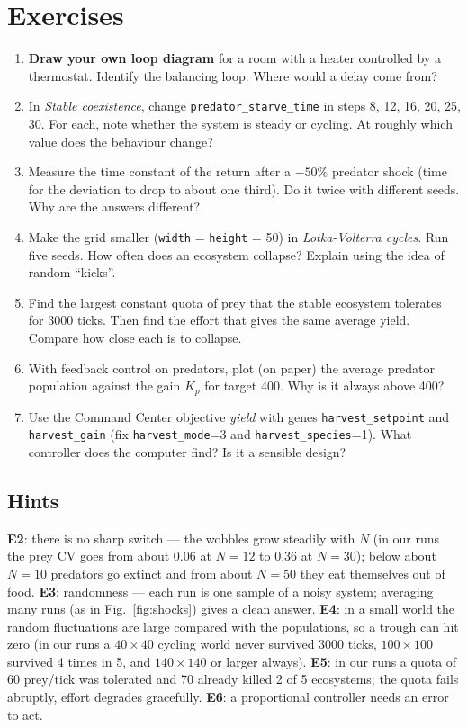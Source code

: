 \documentclass[11pt,a4paper]{article}
\newcommand{\param}[1]{\texttt{\small #1}}
\begin{document}
\section*{Exercises}
\begin{enumerate}[label=\textbf{E\arabic*.}]
  \item \textbf{Draw your own loop diagram} for a room with a heater controlled by a thermostat. Identify the
        balancing loop. Where would a delay come from?
  \item In \emph{Stable coexistence}, change \param{predator\_starve\_time} in steps 8, 12, 16, 20, 25, 30.
        For each, note whether the system is steady or cycling. At roughly which value does the behaviour change?
  \item Measure the time constant of the return after a $-50\%$ predator shock (time for the deviation to
        drop to about one third). Do it twice with different seeds. Why are the answers different?
  \item Make the grid smaller (\param{width} = \param{height} = 50) in \emph{Lotka-Volterra cycles}. Run five seeds.
        How often does an ecosystem collapse? Explain using the idea of random ``kicks''.
  \item Find the largest constant quota of prey that the stable ecosystem tolerates for 3000 ticks.
        Then find the effort that gives the same average yield. Compare how close each is to collapse.
  \item With feedback control on predators, plot (on paper) the average predator population against the gain
        $K_p$ for target 400. Why is it always above 400?
  \item Use the Command Center objective \emph{yield} with genes \param{harvest\_setpoint} and
        \param{harvest\_gain} (fix \param{harvest\_mode}=3 and \param{harvest\_species}=1). What controller does the
        computer find? Is it a sensible design?
\end{enumerate}

\subsection*{Hints}
\textbf{E2}: there is no sharp switch --- the wobbles grow steadily with $N$ (in our runs the prey CV goes from
about 0.06 at $N=12$ to 0.36 at $N=30$); below about $N=10$ predators go extinct and from about $N=50$ they
eat themselves out of food. \textbf{E3}: randomness --- each run is one sample of a noisy system; averaging many runs (as in
Fig.~\ref{fig:shocks}) gives a clean answer. \textbf{E4}: in a small world the random fluctuations are large
compared with the populations, so a trough can hit zero (in our runs a $40\times40$ cycling world never
survived 3000 ticks, $100\times100$ survived 4 times in 5, and $140\times140$ or larger always). \textbf{E5}: in our runs a quota of 60 prey/tick was tolerated and 70 already killed 2 of 5 ecosystems;
the quota fails abruptly, effort degrades gracefully. \textbf{E6}: a proportional controller needs an error to act.
\end{document}
